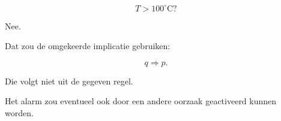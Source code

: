 \documentclass{ximera}
\begin{document}
\begin{oefening}{\oefU\ESS}
\begin{question}
\[
T>100^\circ\mathrm{C}?
\]

\begin{oplossing}

Nee.

Dat zou de omgekeerde implicatie gebruiken:

\[
q\Rightarrow p.
\]

Die volgt niet uit de gegeven regel.

Het alarm zou eventueel ook door een andere oorzaak geactiveerd kunnen
worden.

\end{oplossing}

\end{question}

\end{oefening}


\end{document}
